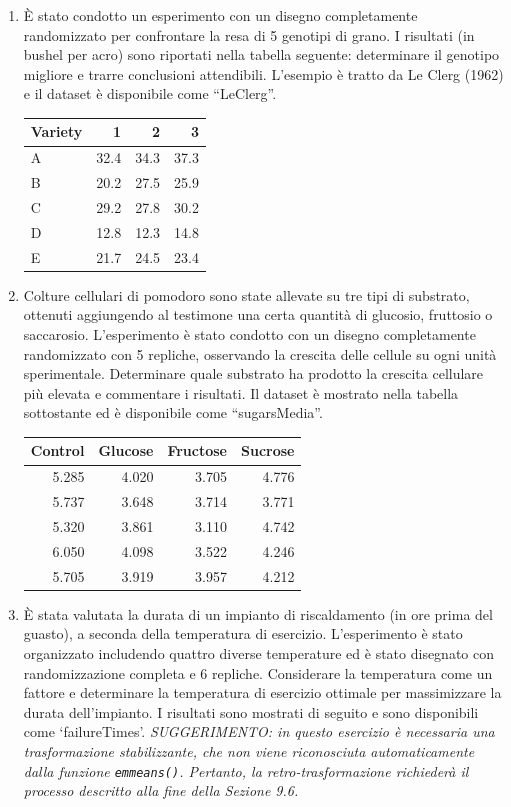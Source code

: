 \documentclass[
  12pt,
]{book}
\begin{document}
\begin{enumerate}
\def\labelenumi{\arabic{enumi}.}
\item
  È stato condotto un esperimento con un disegno completamente randomizzato per confrontare la resa di 5 genotipi di grano. I risultati (in bushel per acro) sono riportati nella tabella seguente: determinare il genotipo migliore e trarre conclusioni attendibili. L'esempio è tratto da Le Clerg (1962) e il dataset è disponibile come ``LeClerg''.

  \begin{longtable}[]{@{}lrrr@{}}
  \toprule()
  Variety & 1 & 2 & 3 \\
  \midrule()
  \endhead
  A & 32.4 & 34.3 & 37.3 \\
  B & 20.2 & 27.5 & 25.9 \\
  C & 29.2 & 27.8 & 30.2 \\
  D & 12.8 & 12.3 & 14.8 \\
  E & 21.7 & 24.5 & 23.4 \\
  \bottomrule()
  \end{longtable}
\item
  Colture cellulari di pomodoro sono state allevate su tre tipi di substrato, ottenuti aggiungendo al testimone una certa quantità di glucosio, fruttosio o saccarosio. L'esperimento è stato condotto con un disegno completamente randomizzato con 5 repliche, osservando la crescita delle cellule su ogni unità sperimentale. Determinare quale substrato ha prodotto la crescita cellulare più elevata e commentare i risultati. Il dataset è mostrato nella tabella sottostante ed è disponibile come ``sugarsMedia''.

  \begin{longtable}[]{@{}rrrr@{}}
  \toprule()
  Control & Glucose & Fructose & Sucrose \\
  \midrule()
  \endhead
  5.285 & 4.020 & 3.705 & 4.776 \\
  5.737 & 3.648 & 3.714 & 3.771 \\
  5.320 & 3.861 & 3.110 & 4.742 \\
  6.050 & 4.098 & 3.522 & 4.246 \\
  5.705 & 3.919 & 3.957 & 4.212 \\
  \bottomrule()
  \end{longtable}
\item
  È stata valutata la durata di un impianto di riscaldamento (in ore prima del guasto), a seconda della temperatura di esercizio. L'esperimento è stato organizzato includendo quattro diverse temperature ed è stato disegnato con randomizzazione completa e 6 repliche. Considerare la temperatura come un fattore e determinare la temperatura di esercizio ottimale per massimizzare la durata dell'impianto. I risultati sono mostrati di seguito e sono disponibili come `failureTimes'. \emph{SUGGERIMENTO: in questo esercizio è necessaria una trasformazione stabilizzante, che non viene riconosciuta automaticamente dalla funzione \texttt{emmeans()}. Pertanto, la retro-trasformazione richiederà il processo descritto alla fine della Sezione 9.6.}


\end{enumerate}
\end{document}
